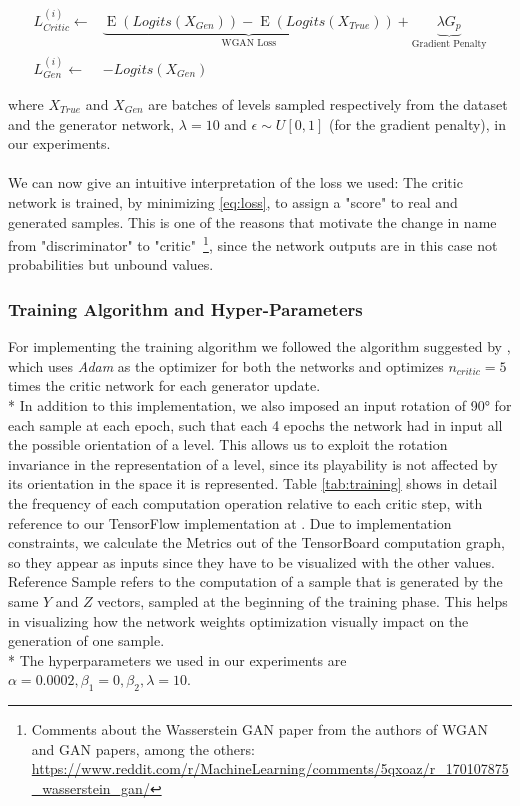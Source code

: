 \begin{equation}
\label{eq:loss}
 \begin{split}
L_{Critic}^{(i)} \gets & \underbrace{\operatorname{E}(Logits(X_{Gen})) - \operatorname{E}(Logits(X_{True}))}_{\text{WGAN Loss}} + \underbrace {\lambda G_p}_{\text{Gradient Penalty}} \\
L_{Gen}^{(i)} \gets & -Logits(X_{Gen}) 
\end{split}
\end{equation}

where $X_{True}$ and $X_{Gen}$ are batches of levels sampled respectively from the dataset and the generator network, $\lambda = 10$ and $ \epsilon \sim U[0,1] $ (for the gradient penalty), in our experiments.

\paragraph{} We can now give an intuitive interpretation of the loss we used: The critic network is trained, by minimizing \ref{eq:loss}, to assign a "score" to real and generated samples. This is one of the reasons that motivate the change in name from "discriminator" to "critic"~\footnote{ Comments about the Wasserstein GAN paper from the authors of WGAN and GAN papers, among the others: \url{https://www.reddit.com/r/MachineLearning/comments/5qxoaz/r_170107875_wasserstein_gan/}}, since the network outputs are in this case not probabilities but unbound values.

\subsubsection{Training Algorithm and Hyper-Parameters}
For implementing the training algorithm we followed the algorithm suggested by \cite[alg.~1. p.~4]{wgangp}, which uses \textit{Adam}\cite{adam} as the optimizer for both the networks and optimizes $n_{critic} = 5$ times the critic network for each generator update. \\*
In addition to this implementation, we also imposed an input rotation of 90° for each sample at each epoch, such that each 4 epochs the network had in input all the possible orientation of a level. This allows us to exploit the rotation invariance in the representation of a level, since its playability is not affected by its orientation in the space it is represented. Table \ref{tab:training} shows in detail the frequency of each computation operation relative to each critic step, with reference to our TensorFlow implementation at \cite{gitrepo}. Due to implementation constraints, we calculate the Metrics out of the TensorBoard computation graph, so they appear as inputs since they have to be visualized with the other values. Reference Sample refers to the computation of a sample that is generated by the same $Y$ and $Z$ vectors, sampled at the beginning of the training phase. This helps in visualizing how the network weights optimization visually impact on the generation of one sample. \\*
 The  hyperparameters we used in our experiments are $\alpha=0.0002, \beta_1=0, \beta_2, \lambda=10$.
 

